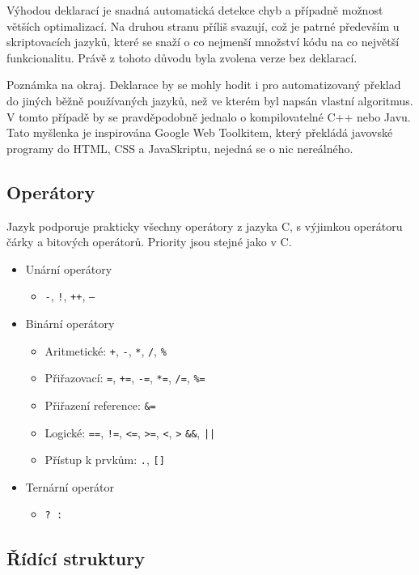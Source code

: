 \documentclass[11pt,twoside,a4paper]{book}
\begin{document}
Výhodou deklarací je snadná automatická detekce chyb a případně možnost větších optimalizací. Na druhou stranu příliš svazují, což je patrné především u skriptovacích jazyků, které se snaží o co nejmenší množství kódu na co největší funkcionalitu. Právě z tohoto důvodu byla zvolena verze bez deklarací.

Poznámka na okraj. Deklarace by se mohly hodit i pro automatizovaný překlad do jiných běžně používaných jazyků, než ve kterém byl napsán vlastní algoritmus. V tomto případě by se pravděpodobně jednalo o kompilovatelné C++ nebo Javu. Tato myšlenka je inspirována Google Web Toolkitem, který překládá javovské programy do HTML, CSS a JavaSkriptu, nejedná se o nic nereálného.


\subsection{Operátory}

Jazyk podporuje prakticky všechny operátory z jazyka C, s výjimkou operátoru čárky a bitových operátorů. Priority jsou stejné jako v C.

\begin{itemize}
\item Unární operátory
	\begin{itemize}
	\item \texttt{-}, \texttt{!}, \texttt{++}, \texttt{--}
	\end{itemize}
\item Binární operátory
	\begin{itemize}
	\item Aritmetické: \texttt{+}, \texttt{-}, \texttt{*}, \texttt{/}, \texttt{\%}
	\item Přiřazovací: \texttt{=}, \texttt{+=}, \texttt{-=}, \texttt{*=}, \texttt{/=}, \texttt{\%=}
	\item Přiřazení reference: \texttt{\&=}
	\item Logické: \texttt{==}, \texttt{!=}, \texttt{<=}, \texttt{>=}, \texttt{<}, \texttt{>} \texttt{\&\&}, \texttt{||}
	\item Přístup k prvkům: \texttt{.}, \texttt{[]}
	\end{itemize}
\item Ternární operátor
	\begin{itemize}
	\item \texttt{? :}
	\end{itemize}
\end{itemize}


\subsection{Řídící struktury}
\end{document}
